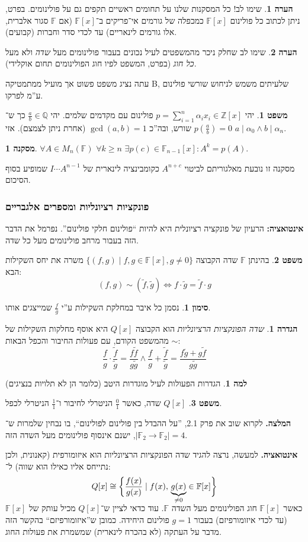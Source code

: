 \documentclass[a4paper]{article}
\newcommand\Z     {\mathbb{Z}}
\newcommand\Q     {\mathbb{Q}}
\newcommand\sumnio    {\sum_{i = 1}^{n}}
\newcommand\F         {\mathbb{F}}
\newcommand\co        {\colon}
\newcommand\ag        {\alpha}
\newcommand\tl    {\tilde}
\newcommand\sof[1]    {\left | #1 \right |}
\newcommand\cl [1]    {\left ( #1 \right )}
\newcommand\ccb[1]    {\left \{ #1 \right \}}
\theoremstyle{definition}
\newtheorem{Theorem}{\color{myblue}משפט}
\newtheorem{Definition}{\color{mygreen}הגדרה}
\newtheorem{Lemma}{\color{myyellow}למה}
\newtheorem{Remark}{\color{mycyan}הערה}
\newtheorem{Notion}{\color{myred}סימון}
\newtheorem{Collary}{\color{mymagenta}מסקנה}
\newcommand\cola [1] {\begin{Collary}#1\end{Collary}}
\newcommand\theo  [1] {\begin{Theorem}#1\end{Theorem}}
\newcommand\defi  [1] {\begin{Definition}#1\end{Definition}}
\newcommand\rmark [1] {\begin{Remark}#1\end{Remark}}
\newcommand\lem   [1] {\begin{Lemma}#1\end{Lemma}}
\newcommand\noti  [1] {\begin{Notion}#1\end{Notion}}
\begin{document}
	\rmark{שימו לב! כל המסקנות שלנו על תחומים ראשיים תקפים גם על פולינומים. בפרט, ניתן לכתוב כל פולינום $\F[x]$ כמכפלה של גורמים אי־פריקים ב־$\F[x]$ (אם $\F$ סגור אלברית, אלו גורמים לינאריים) עד לכדי סדר וחברות (קבועים). }
	\rmark{שימו לב שחלק ניכר מהמשפטים לעיל נכונים בעבור פולינומים מעל \textit{שדה} ולא מעל \textit{כל חוג} (בפרט, המשפט לפיו חוג הפולינומים תחום אוקלידי). }
	עתה נציג משפט פשוט אך מועיל ממתמטיקה B, שלעיתים משמש לניחוש שורשי פולינום ע''מ לפרקו. 
	\theo{יהי $p = \sumnio \ag_i x_i \in \Z[x]$ פולינום עם מקדמים שלמים. יהי $\frac{a}{b} \in \Q$ כך ש־$p\cl{\frac{a}{b}} = 0$ שורש, ובה''כ $\gcd(a, b) = 1$ (אחרת ניתן לצמצם). אזי $a \mid \ag_0 \land b \mid \ag_n$. }
	
	\cola{$\forall A \in M_n(\F) \,\, \forall k \ge n \,\, \exists p(c) \in \F_{n - 1}[x] \co A^{k} = p(A)$. }
	מסקנה זו נובעת מאלגוריתם לביטוי $A^{n + c}$ כקומבינציה לינארית של $I \cdots A^{n - 1}$ שמופיע בסוף הסיכום. 
	
	\subsubsection{פונקציות רציונליות ומספרים אלגבריים}
	\textbf{אינטואציה: }הרעיון של פונקציה רציונלית היא להיות ``פולינום חלקי פולינום''. נפרמל את הדבר הזה בעבור מרחב פולינומים מעל כל שדה. 
	
	\theo{בהינתן $\F$ שדה הקבוצה $\{(f, g) \mid f, g \in \F[x], g \neq 0\}$ משרה את יחס השקילות הבא: 
	\[ (f, g) \sim (\tl f, \tl g) \iff f \cdot \tl g = \tl f \cdot g \]}
	\noti{נסמן כל איבר במחלקת השקילות ע''י $\frac{f}{g}$ שמייצגים אותו. }
	\defi{\textit{שדה הפונקציות הרציונליות} הוא הקבוצה $Q[x]$ היא אוסף מחלקות השקילות של $\sim$ מהמשפט הקודם, עם פעולות החיבור והכפל הבאות: 
	\[ \frac{f}{g} \cdot \frac{\tl f}{\tl g} = \frac{f \tl f}{g \tl g} \land \frac{f}{g} + \frac{\tl f}{\tl g} = \frac{f \tl g + g \tl f}{g \tl g} \]}
	\lem{הגדרות הפעולות לעיל מוגדרות היטב (כלומר הן לא תלויות בנציגים)}
	\theo{$Q[x]$ שדה, כאשר $\frac{0}{1}$ הניטרלי לחיבור ו־$\frac{1}{1}$ הניטרלי לכפל. }
	\textbf{המלצה. }לקרוא שוב את פרק 2.1, ''על ההבדל בין פולינום לפולינום``, בו נבחין שלמרות ש־$\sof{\F_2 \to \F_2} = 4$, ישנם אינסוף פולינומים מעל השדה הזה. 
	
	\textbf{אינטואציה. }למעשה, נרצה להגיד שדה הפונקציות הרציונליות הוא איזומורפית (קאנונית, ולכן נתייחס אליו כאילו הוא שווה) ל־: 
	\[ Q[x] \cong \ccb{\frac{f(x)}{g(x)} \mid f(x), \,\smash{\underbrace{g(x)}_{\neq 0}} \in \F[x]} \]
	כאשר $\F[x]$ חוג הפולינומים מעל השדה $\F$. עוד כדאי לציין ש־$Q[x]$ מכיל עותק של $\F[x]$ (עד לכדי איזומורפיזם) בעבור $g = 1$ פולינום היחידה. כמובן ש''איזומורפיזם`` בהקשר הזה מדבר על העתקה (לא בהכרח לינארית) שמשמרת את פעולות החוג. 
	
\end{document}
